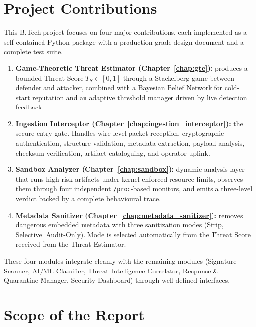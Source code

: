 \documentclass[12pt, a4paper]{report}
\begin{document}
\section{Project Contributions}

This B.Tech project focuses on four major contributions, each implemented
as a self-contained Python package with a production-grade design document
and a complete test suite.

\begin{enumerate}
    \item \textbf{Game-Theoretic Threat Estimator
          (Chapter~\ref{chap:gte}):} produces a bounded Threat Score
          $T_S \in [0,1]$ through a Stackelberg game between defender and
          attacker, combined with a Bayesian Belief Network for cold-start
          reputation and an adaptive threshold manager driven by live
          detection feedback.
    \item \textbf{Ingestion Interceptor (Chapter~\ref{chap:ingestion_interceptor}):}
          the secure entry gate. Handles wire-level packet reception,
          cryptographic authentication, structure validation, metadata
          extraction, payload analysis, checksum verification, artifact
          cataloguing, and operator uplink.
    \item \textbf{Sandbox Analyzer (Chapter~\ref{chap:sandbox}):} dynamic
          analysis layer that runs high-risk artifacts under kernel-enforced
          resource limits, observes them through four independent
          \texttt{/proc}-based monitors, and emits a three-level verdict
          backed by a complete behavioural trace.
    \item \textbf{Metadata Sanitizer (Chapter~\ref{chap:metadata_sanitizer}):}
          removes dangerous embedded metadata with three sanitization modes
          (Strip, Selective, Audit-Only). Mode is selected automatically
          from the Threat Score received from the Threat Estimator.
\end{enumerate}

These four modules integrate cleanly with the remaining modules (Signature Scanner, AI/ML
Classifier, Threat Intelligence Correlator, Response \& Quarantine Manager,
Security Dashboard) through well-defined interfaces.

\section{Scope of the Report}
\end{document}
